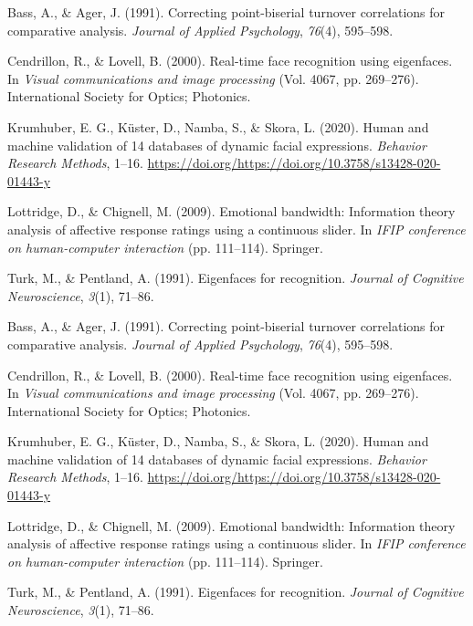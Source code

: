 \documentclass[]{article}
\newlength{\cslhangindent}
\newenvironment{cslreferences}%
  {\setlength{\parindent}{0pt}%
  \everypar{\setlength{\hangindent}{\cslhangindent}}\ignorespaces}%
  {\par}
\begin{document}
\hypertarget{refs}{}
\begin{cslreferences}
\leavevmode\hypertarget{ref-bass1991correcting}{}%
Bass, A., \& Ager, J. (1991). Correcting point-biserial turnover correlations for comparative analysis. \emph{Journal of Applied Psychology}, \emph{76}(4), 595--598.

\leavevmode\hypertarget{ref-cendrillon2000real}{}%
Cendrillon, R., \& Lovell, B. (2000). Real-time face recognition using eigenfaces. In \emph{Visual communications and image processing} (Vol. 4067, pp. 269--276). International Society for Optics; Photonics.

\leavevmode\hypertarget{ref-krumhuber2020human}{}%
Krumhuber, E. G., Küster, D., Namba, S., \& Skora, L. (2020). Human and machine validation of 14 databases of dynamic facial expressions. \emph{Behavior Research Methods}, 1--16. \url{https://doi.org/https://doi.org/10.3758/s13428-020-01443-y}

\leavevmode\hypertarget{ref-lottridge2009emotional}{}%
Lottridge, D., \& Chignell, M. (2009). Emotional bandwidth: Information theory analysis of affective response ratings using a continuous slider. In \emph{IFIP conference on human-computer interaction} (pp. 111--114). Springer.

\leavevmode\hypertarget{ref-turk1991eigenfaces}{}%
Turk, M., \& Pentland, A. (1991). Eigenfaces for recognition. \emph{Journal of Cognitive Neuroscience}, \emph{3}(1), 71--86.

\leavevmode\hypertarget{ref-bass1991correcting}{}%
Bass, A., \& Ager, J. (1991). Correcting point-biserial turnover correlations for comparative analysis. \emph{Journal of Applied Psychology}, \emph{76}(4), 595--598.

\leavevmode\hypertarget{ref-cendrillon2000real}{}%
Cendrillon, R., \& Lovell, B. (2000). Real-time face recognition using eigenfaces. In \emph{Visual communications and image processing} (Vol. 4067, pp. 269--276). International Society for Optics; Photonics.

\leavevmode\hypertarget{ref-krumhuber2020human}{}%
Krumhuber, E. G., Küster, D., Namba, S., \& Skora, L. (2020). Human and machine validation of 14 databases of dynamic facial expressions. \emph{Behavior Research Methods}, 1--16. \url{https://doi.org/https://doi.org/10.3758/s13428-020-01443-y}

\leavevmode\hypertarget{ref-lottridge2009emotional}{}%
Lottridge, D., \& Chignell, M. (2009). Emotional bandwidth: Information theory analysis of affective response ratings using a continuous slider. In \emph{IFIP conference on human-computer interaction} (pp. 111--114). Springer.

\leavevmode\hypertarget{ref-turk1991eigenfaces}{}%
Turk, M., \& Pentland, A. (1991). Eigenfaces for recognition. \emph{Journal of Cognitive Neuroscience}, \emph{3}(1), 71--86.
\end{cslreferences}
\end{document}
